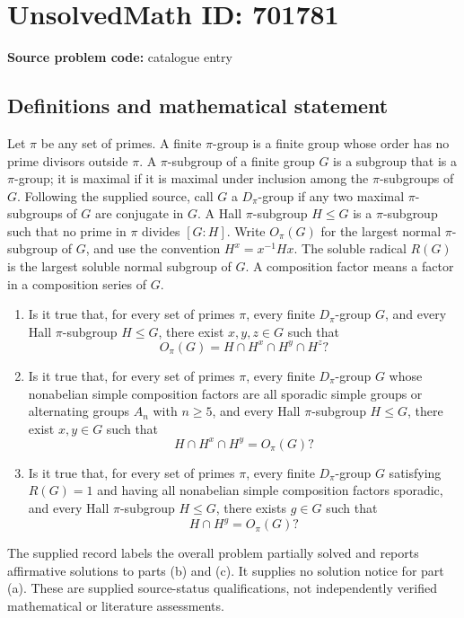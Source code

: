 \documentclass[11pt]{article}
\begin{document}
\section*{UnsolvedMath ID: 701781}
\textbf{Source problem code:} catalogue entry
\subsection{Definitions and mathematical statement}
Let \(\pi\) be any set of primes. A finite \(\pi\)-group is a finite group whose order has no prime divisors outside \(\pi\). A \(\pi\)-subgroup of a finite group \(G\) is a subgroup that is a \(\pi\)-group; it is maximal if it is maximal under inclusion among the \(\pi\)-subgroups of \(G\). Following the supplied source, call \(G\) a \(D_{\pi}\)-group if any two maximal \(\pi\)-subgroups of \(G\) are conjugate in \(G\). A Hall \(\pi\)-subgroup \(H\leq G\) is a \(\pi\)-subgroup such that no prime in \(\pi\) divides \([G:H]\). Write \(O_{\pi}(G)\) for the largest normal \(\pi\)-subgroup of \(G\), and use the convention \(H^x=x^{-1}Hx\). The soluble radical \(R(G)\) is the largest soluble normal subgroup of \(G\). A composition factor means a factor in a composition series of \(G\).

\begin{enumerate}
\item[(a)] Is it true that, for every set of primes \(\pi\), every finite \(D_{\pi}\)-group \(G\), and every Hall \(\pi\)-subgroup \(H\leq G\), there exist \(x,y,z\in G\) such that
\[
O_{\pi}(G)=H\cap H^x\cap H^y\cap H^z?
\]
\item[(b)] Is it true that, for every set of primes \(\pi\), every finite \(D_{\pi}\)-group \(G\) whose nonabelian simple composition factors are all sporadic simple groups or alternating groups \(A_n\) with \(n\geq 5\), and every Hall \(\pi\)-subgroup \(H\leq G\), there exist \(x,y\in G\) such that
\[
H\cap H^x\cap H^y=O_{\pi}(G)?
\]
\item[(c)] Is it true that, for every set of primes \(\pi\), every finite \(D_{\pi}\)-group \(G\) satisfying \(R(G)=1\) and having all nonabelian simple composition factors sporadic, and every Hall \(\pi\)-subgroup \(H\leq G\), there exists \(g\in G\) such that
\[
H\cap H^g=O_{\pi}(G)?
\]
\end{enumerate}

The supplied record labels the overall problem partially solved and reports affirmative solutions to parts (b) and (c). It supplies no solution notice for part (a). These are supplied source-status qualifications, not independently verified mathematical or literature assessments.
\end{document}
